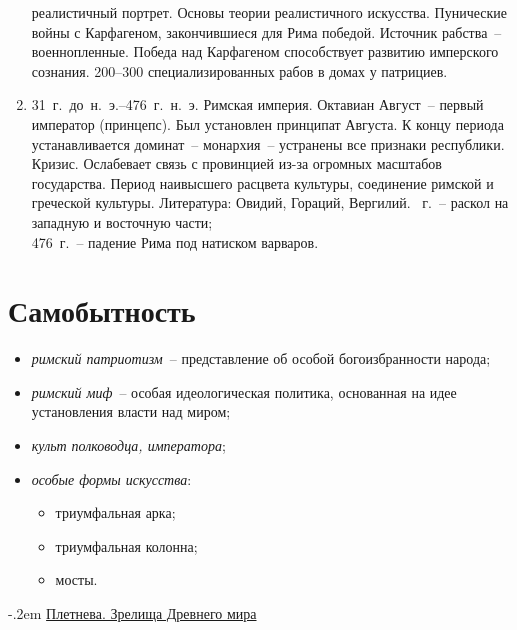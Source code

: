 \begin{enumerate}
      реалистичный портрет. Основы теории реалистичного искусства.
      \medskip
      Пунические войны с Карфагеном, закончившиеся для Рима победой. Источник
      рабства~-- военнопленные. Победа над Карфагеном способствует развитию
      имперского сознания. 200--300 специализированных рабов в домах у
      патрициев.
    \item 31~г.~до~н.~э.--476~г.~н.~э. Римская империя.
      \medskip
      Октавиан Август~-- первый император (принцепс). Был установлен принципат
      Августа. К концу периода устанавливается доминат~-- монархия~-- устранены
      все признаки республики. Кризис. Ослабевает связь с провинцией из-за
      огромных масштабов государства.
      \medskip
      Период наивысшего расцвета культуры, соединение римской и греческой
      культуры. Литература: Овидий, Гораций, Вергилий.
      ~г.~-- раскол на западную и восточную части; \\
      476~г.~-- падение Рима под натиском варваров.
  \end{enumerate}
  
\section{Самобытность}

  \begin{itemize}
    \item \emph{римский патриотизм}~-- представление об особой богоизбранности
      народа;
    \item \emph{римский миф}~-- особая идеологическая политика, основанная на
      идее установления власти над миром;
    \item \emph{культ полководца, императора};
    \item \emph{особые формы искусства}:
      \begin{itemize}
        \item триумфальная арка;
        \item триумфальная колонна;
        \item мосты.
      \end{itemize}
  \end{itemize}

  \begin{thebibliography}{9}
    \itemsep -.2em
     \href{}{Плетнева. Зрелища
      Древнего мира}
  \end{thebibliography}
